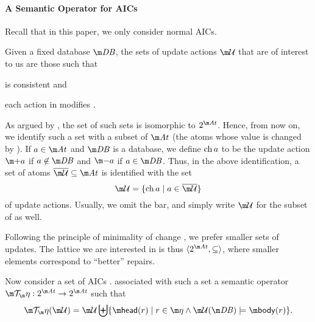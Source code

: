 \paragraph{A Semantic Operator for AICs}
Recall that in this paper, we only consider normal AICs.

Given a fixed database $\db$,
the sets of update actions $\UU$ that are of interest to us are those such that 
\begin{inparaenum}
\item \UU is consistent and 
\item each action in \UU modifies \db.
\end{inparaenum}
As argued by  \citet{iclp/Cruz-Filipe16}, the set of such sets is isomorphic to $2^{\atoms}$. Hence, from now on, we identify such a set with a subset of $\atoms$ (the atoms whose value is changed by \UU). 
If $a\in \atoms$ and $\db$ is a database, we define $\operatorname{ch} a$ to be the update action $\add a$ if $a\not\in \db$ and $\remove a$ if $a \in \db$. 
Thus, in the above identification, a set  of atoms $\overline\UU\subseteq \atoms$ is identified with the set 
\[\UU = \{\change a\mid a \in \overline \UU \}\]
of update actions.
Usually, we omit the bar, and simply write $\UU$ for the subset of \atoms as well.

Following the principle of minimality of change \cite{Winslett90,ai/EiterG92}, we prefer smaller sets of updates. %
The lattice we are interested in is thus $\langle 2^{\atoms}, \subseteq\rangle$, where  smaller elements correspond to ``better'' repairs. 


Now consider a set of AICs \aics. 
 associated with such a set a semantic operator
$\Op: 2^{\atoms}\to  2^{\atoms}$ such that
\[\Op(\UU) = \UU \biguplus \{\head(r) \mid r\in\aics \land  \UU(\db)\models \body(r)\}.\]

